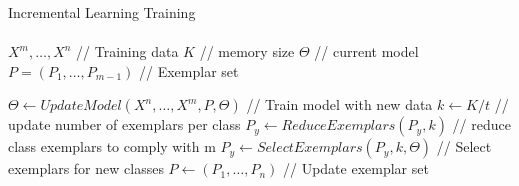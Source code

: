 \documentclass[aspectratio=169, xcolor=dvipsnames]{beamer}
\begin{document}
\begin{frame}{Incremental Learning Training}
      \framesubtitle{}%
      
      \vspace{-0.5cm}
      \begin{algorithm}[H]
      \begin{algorithmic}[1]
      \ENSURE $X^m, \ldots, X^n$ \hspace{0.25cm} // Training data 
      \ENSURE $K$ \hspace{0.25cm} // memory size
      \REQUIRE $\Theta$ \hspace{0.25cm} // current model
      \REQUIRE $P = (P_1, \ldots, P_{m-1})$ \hspace{0.25cm} // Exemplar set
      
      \STATE $\Theta \gets UpdateModel(X^n, \ldots, X^m, P, \Theta)$ \hspace{0.25cm} // Train model with new data
      \STATE $k \gets K/t$ \hspace{0.25cm} // update number of exemplars per class
      \STATE $P_y \gets ReduceExemplars(P_y, k)$ \hspace{0.25cm} // reduce class exemplars to comply with m
      \ENDFOR
      \STATE $P_y \gets SelectExemplars(P_y, k, \Theta)$ \hspace{0.25cm} // Select exemplars for new classes
      \ENDFOR
      \STATE $P \gets (P_1, \ldots, P_{n})$ \hspace{0.25cm} // Update exemplar set
      \end{algorithmic}
      \caption{Incremental Learning Training Loop}
      \label{alg:iltrain}
      \end{algorithm}
\end{frame}
\end{document}
